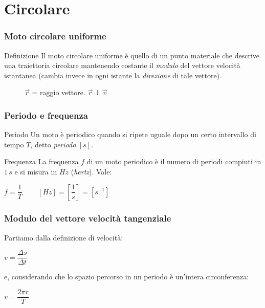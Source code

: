 \documentclass[]{beamer}
\theoremstyle{plain}
\begin{document}
\section{Circolare}

\begin{frame}
\frametitle{Moto circolare uniforme}
  \begin{block}{Definizione}
    Il moto circolare uniforme è quello di un punto materiale che descrive una traiettoria circolare mantenendo costante il \emph{modulo} del vettore velocità istantanea (cambia invece in ogni istante la \emph{direzione} di tale vettore).
  \end{block}
  
\begin{figure}

$ \vec{r} $ = raggio vettore. $ \vec{r}\perp\vec{v} $
\end{figure}
\end{frame}


\begin{frame}
\frametitle{Periodo e frequenza}
  \begin{block}{Periodo}
    Un moto è periodico quando si ripete uguale dopo un certo intervallo di tempo $ T $, detto \emph{periodo} $ [s] $.
  \end{block}\pause
  \begin{block}{Frequenza}
    La frequenza $ f $ di un moto periodico è il numero di periodi compiuti in $ 1 \, s $ e si misura in $ Hz $ (\emph{hertz}). Vale:
    \begin{center}
\colorbox{blue!30}{$ f = \dfrac{1}{T} $} ~~~ $  [Hz] = \left[ \dfrac{1}{s} \right] = \left[s^{-1}\right] $
\end{center}
  \end{block}

\end{frame}




\begin{frame}
  \frametitle{Modulo del vettore velocità tangenziale}
  Partiamo dalla definizione di velocità:
  \begin{center}
$ v = \dfrac{\Delta s}{\Delta t} $
  \end{center}\pause
  e, considerando che lo spazio percorso in un periodo è un'intera circonferenza:
  \begin{center}
\colorbox{blue!30}{$ v = \dfrac{2\pi r}{T} $}
  \end{center}
\end{frame}
\end{document}
